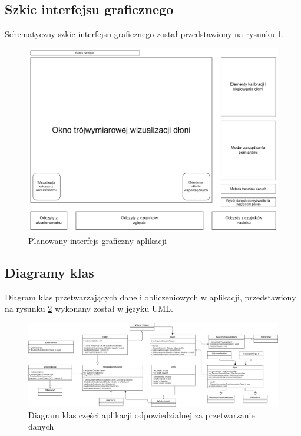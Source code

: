 \documentclass[12pt,a4paper]{article}
\begin{document}
\subsection{Szkic interfejsu graficznego}
Schematyczny szkic interfejsu graficznego został przedstawiony na rysunku \ref{fig:interface}.
\begin{figure}[!htb]
\centering
\includegraphics[width=\textwidth]{./WDS_schemat_ideowy_okna_programu.png}
\caption{Planowany interfejs graficzny aplikacji\label{fig:interface}}
\end{figure}

\newpage
\subsection{Diagramy klas}
Diagram klas przetwarzających dane i obliczeniowych w aplikacji, przedstawiony na rysunku \ref{fig:classdiagram} wykonany został w języku UML.\\
\begin{figure}[!htb]
\centering
\includegraphics[angle=90,height=0.8\textheight]{./ClassDiagram.png}
\caption{Diagram klas części aplikacji odpowiedzialnej za przetwarzanie danych\label{fig:classdiagram}}
\end{figure}
\end{document}
